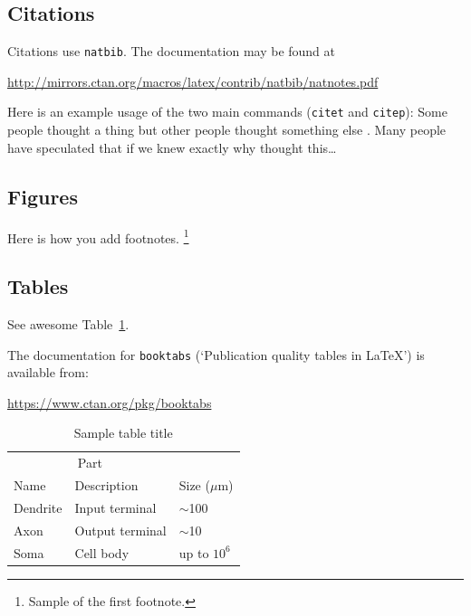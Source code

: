 \documentclass[11pt]{article}
\begin{document}
\subsection{Citations}
Citations use \verb+natbib+. The documentation may be found at
\begin{center}
	\url{http://mirrors.ctan.org/macros/latex/contrib/natbib/natnotes.pdf}
\end{center}

Here is an example usage of the two main commands (\verb+citet+ and \verb+citep+): Some people thought a thing \citep{kour2014real, hadash2018estimate} but other people thought something else \citep{kour2014fast}. Many people have speculated that if we knew exactly why \citet{kour2014fast} thought this\dots

\subsection{Figures}
\lipsum[10]
Here is how you add footnotes. \footnote{Sample of the first footnote.}
\lipsum[11]


\subsection{Tables}
See awesome Table~\ref{tab:table}.

The documentation for \verb+booktabs+ (`Publication quality tables in LaTeX') is available from:
\begin{center}
	\url{https://www.ctan.org/pkg/booktabs}
\end{center}


\begin{table}
	\caption{Sample table title}
	\centering
	\begin{tabular}{lll}
		\toprule
		\multicolumn{2}{c}{Part}                   \\
		\cmidrule(r){1-2}
		Name     & Description     & Size ($\mu$m) \\
		\midrule
		Dendrite & Input terminal  & $\sim$100     \\
		Axon     & Output terminal & $\sim$10      \\
		Soma     & Cell body       & up to $10^6$  \\
		\bottomrule
	\end{tabular}
	\label{tab:table}
\end{table}
\end{document}
